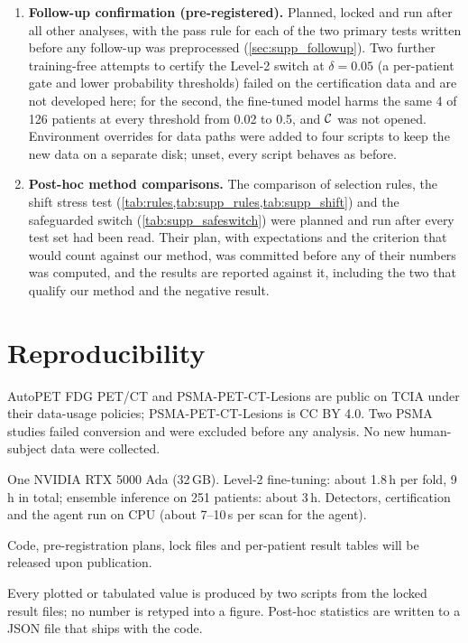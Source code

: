 \begin{enumerate}[nosep,leftmargin=*]
\item \textbf{Follow-up confirmation (pre-registered).} Planned, locked and run after all other analyses, with the pass rule for each of the two primary tests written before any follow-up was preprocessed (\cref{sec:supp_followup}). Two further training-free attempts to certify the Level-2 switch at $\delta=0.05$ (a per-patient gate and lower probability thresholds) failed on the certification data and are not developed here; for the second, the fine-tuned model harms the same 4 of 126 patients at every threshold from 0.02 to 0.5, and $\mathcal{C}$ was not opened. Environment overrides for data paths were added to four scripts to keep the new data on a separate disk; unset, every script behaves as before.
\item \textbf{Post-hoc method comparisons.} The comparison of selection rules, the shift stress test (\cref{tab:rules,tab:supp_rules,tab:supp_shift}) and the safeguarded switch (\cref{tab:supp_safeswitch}) were planned and run after every test set had been read. Their plan, with expectations and the criterion that would count against our method, was committed before any of their numbers was computed, and the results are reported against it, including the two that qualify our method and the negative result.
\end{enumerate}

\section{Reproducibility}
\label{sec:supp_repro}

 AutoPET FDG PET/CT and PSMA-PET-CT-Lesions are public on TCIA under their data-usage policies; PSMA-PET-CT-Lesions is CC BY 4.0. Two PSMA studies failed conversion and were excluded before any analysis. No new human-subject data were collected.

 One NVIDIA RTX 5000 Ada (32\,GB). Level-2 fine-tuning: about 1.8\,h per fold, 9\,h in total; ensemble inference on 251 patients: about 3\,h. Detectors, certification and the agent run on CPU (about 7--10\,s per scan for the agent).

 Code, pre-registration plans, lock files and per-patient result tables will be released upon publication.

 Every plotted or tabulated value is produced by two scripts from the locked result files; no number is retyped into a figure. Post-hoc statistics are written to a JSON file that ships with the code.

